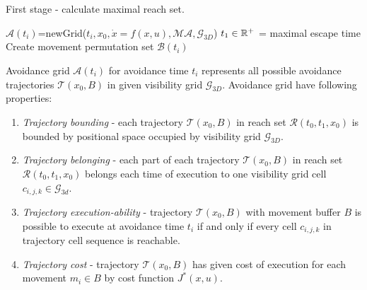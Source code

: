 \begin{algorithm}[H]
    \caption{First stage - calculate maximal reach set.}
    \label{alg:firstStage}
    $\mathscr{A}(t_i)$=newGrid($t_i,x_0,\dot{x}=f(x,u),\mathscr{MA},\mathscr{G}_{3D}$)\;
    $t_1\in \mathbb{R}^+$ = maximal escape time \;
    Create movement permutation set $\mathscr{B}(t_i)$\;
\end{algorithm}
\noindent Avoidance grid $\mathscr{A}(t_i)$ for avoidance time $t_i$ represents all possible avoidance trajectories $\mathscr{T}(x_0,B)$ in given visibility grid $\mathscr{G}_{3D}$. Avoidance grid have following properties:
\begin{enumerate}
    \item \textit{Trajectory bounding} - each trajectory $\mathscr{T}(x_0,B)$ in reach set $\mathscr{R}(t_0,t_1,x_0)$ is bounded by positional space occupied by visibility grid $\mathscr{G}_{3D}$.
    \item \textit{Trajectory belonging} - each part of each trajectory $\mathscr{T}(x_0,B)$ in reach set $\mathscr{R}(t_0,t_1,x_0)$ belongs each time of execution to one visibility grid cell $c_{i,j,k}\in\mathscr{G}_{3d}$.
    \item \textit{Trajectory execution-ability} - trajectory $\mathscr{T}(x_0,B)$ with movement buffer $B$ is possible to execute at avoidance time $t_i$ if and only if every cell $c_{i,j,k}$ in trajectory cell sequence is reachable.
    \item \textit{Trajectory cost} - trajectory $\mathscr{T}(x_0,B)$ has given cost of execution for each movement $m_i\in B$ by cost function $J^*(x,u)$.
\end{enumerate}

